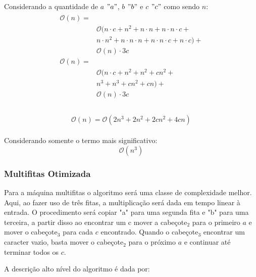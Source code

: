 \documentclass{article}
\begin{document}
Considerando a quantidade de $a$ $"a"$, $b$ $"b"$ e $c$ $"c"$ como sendo $n$:
\begin{align}
  \begin{split}
    \mathcal{O}(n) = &{}\\
                     &\mathcal{O}(n \cdot c + n^2 + n \cdot n + n\cdot n \cdot c + \\
                     &n\cdot n^2 + n \cdot n \cdot n + n \cdot n \cdot c + n \cdot c) +\\
                     &\mathcal{O}(n) \cdot 3c \\
    \mathcal{O}(n) = &{}\\
                     &\mathcal{O}(n \cdot c + n^2 + n^2 + cn^2 + \\
                     &n^3 + n^3 + cn^2 + cn) + \\
                     &\mathcal{O}(n) \cdot 3c \\
  \end{split}
\end{align}

\begin{align}
  \begin{split}
    \mathcal{O}(n) = \mathcal{O}(2n^3 + 2n^2 + 2cn^2 + 4cn)
  \end{split}
\end{align}

Considerando somente o termo mais significativo:
$$\mathcal{O}(n^3)$$
\pagebreak

\subsubsection{Multifitas Otimizada}

Para a máquina multifitas o algoritmo será uma classe de complexidade melhor.
Aqui, ao fazer uso de três fitas, a multiplicação será dada em tempo linear à
entrada. O procedimento será copiar "a" para uma segunda fita e "b" para uma
terceira, a partir disso ao encontrar um c mover a cabeçote$_2$ para o primeiro
$a$ e mover o cabeçote$_3$ para cada $c$ encontrado. Quando o cabeçote$_3$
encontrar um caracter vazio, basta mover o cabeçote$_2$ para o próximo $a$ e
continuar até terminar todos os $c$.

A descrição alto nível do algoritmo é dada por:
\end{document}
